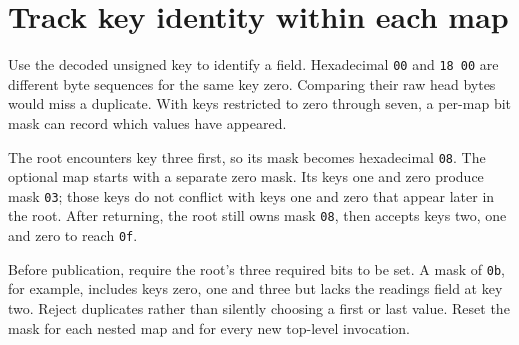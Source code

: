 \section{Track key identity within each map}
Use the decoded unsigned key to identify a field. Hexadecimal \texttt{00} and
\texttt{18 00} are different byte sequences for the same key zero. Comparing their raw
head bytes would miss a duplicate. With keys restricted to zero through seven, a
per-map bit mask can record which values have appeared.

The root encounters key three first, so its mask becomes hexadecimal \texttt{08}.
The optional map starts with a separate zero mask. Its keys one and zero produce mask
\texttt{03}; those keys do not conflict with keys one and zero that appear later in
the root. After returning, the root still owns mask \texttt{08}, then accepts keys two,
one and zero to reach \texttt{0f}.

Before publication, require the root's three required bits to be set. A mask of
\texttt{0b}, for example, includes keys zero, one and three but lacks the readings
field at key two. Reject duplicates rather than silently choosing a first or last value.
Reset the mask for each nested map and for every new top-level invocation.
